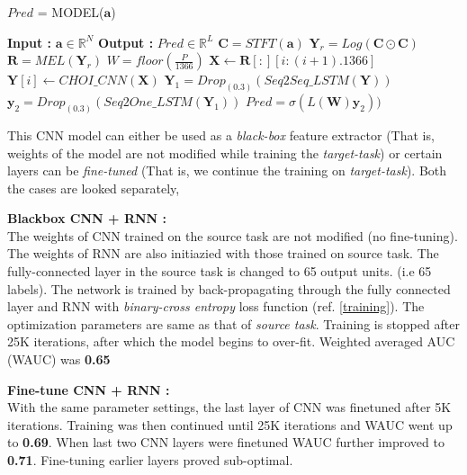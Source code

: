 \begin{algorithm}
  \caption{$Pred$ = MODEL($\textbf{a}$) }
  \label{alg:cnnrnn}
  \begin{algorithmic}[1]
    \Statex \textbf{Input :} $\textbf{a} \in \mathbb{R}^{N}$
    \Statex \textbf{Output :} $Pred \in \mathbb{R}^{L}$ 
    \State $\textbf{C} = STFT(\textbf{a})$ 
    \State $\textbf{Y}_{r} = Log(\textbf{C} \odot \textbf{C})$ 
    \State $\textbf{R} = MEL(\textbf{Y}_{r})$ 
    \State $W = floor(\frac{P}{1366})$
      \State $\textbf{X} \leftarrow \textbf{R}[:][i:(i+1).1366]$ 
      \State $\textbf{Y}[i] \leftarrow CHOI\_CNN(\textbf{X})$  
    \EndFor
    \State $\textbf{Y}_{1} = Drop_{(0.3)}(Seq2Seq\_LSTM(\textbf{Y}))$ 
    \State $\textbf{y}_{2} = Drop_{(0.3)}(Seq2One\_LSTM(\textbf{Y}_{1}))$ 
    \State $Pred = \sigma(L(\textbf{W})\textbf{y}_{2}))$ 
  \end{algorithmic}
\end{algorithm}
\FloatBarrier

\noindent This CNN model can either be used as a \textit{black-box} feature extractor (That is, weights of the model are not modified while training the \textit{target-task}) or certain layers can be \textit{fine-tuned} (That is, we continue the training on \textit{target-task}). Both the cases are looked separately,
\bigskip

\noindent \textbf{Blackbox CNN + RNN :}\\ 
The weights of CNN trained on the source task are not modified (no fine-tuning). The weights of RNN are also initiazied with those trained on source task. The fully-connected layer in the source task is changed to 65 output units. (i.e 65 labels). The network is trained by back-propagating through the fully connected layer and RNN with \textit{binary-cross entropy} loss function (ref. \ref{training}). The optimization parameters are same as that of \textit{source task}. Training is stopped after 25K iterations, after which the model begins to over-fit. Weighted averaged AUC (WAUC) was \textbf{0.65}
\bigskip

\noindent \textbf{Fine-tune CNN + RNN :}\\
With the same parameter settings, the last layer of CNN was finetuned after 5K iterations. Training was then continued until 25K iterations and WAUC went up to \textbf{0.69}. When last two CNN layers were finetuned WAUC further improved to \textbf{0.71}. Fine-tuning earlier layers proved sub-optimal. 
\bigskip

